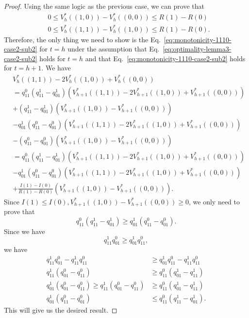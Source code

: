 \begin{proof}
Using the same logic as the previous case, we can prove that 
\begin{align*}
    &0\leq V_h^*\left((1,0)\right)-V_h^*((0,0))\leq{R(1)-R(0)}\\
    &0\leq V_h^*\left((1,1)\right)-V_h^*((1,0))\leq R(1)-R(0).
\end{align*}
Therefore, the only thing we need to show is the Eq.~\eqref{eq:monotonicity-1110-case2-sub2} for $t=h$ under the assumption that Eq.~\eqref{eq:optimality-lemma3-case2-sub2} holds for $t=h$ and that Eq.~\eqref{eq:monotonicity-1110-case2-sub2} holds for $t=h+1$. We have
\begin{align*}
    &V_h^*\left((1,1)\right)-2V_h^*((1,0))+V_h^*((0,0))\\&=q^0_{11}\left(q^1_{11}-q^1_{01}\right)\left(V_{h+1}^*\left((1,1)\right)-2V_{h+1}^*((1,0))+V_{h+1}^*((0,0))\right)\\
    &+\left(q^1_{11}-q^1_{01}\right)\left(V_{h+1}^*\left((1,0)\right)-V_{h+1}^*\left((0,0)\right)\right)\\
    &-q^1_{01}\left(q^0_{11}-q^0_{01}\right)\left(V_{h+1}^*\left((1,1)\right)-2V_{h+1}^*((1,0))+V_{h+1}^*((0,0))\right)\\
    &-\left(q^0_{11}-q^0_{01}\right)\left(V_{h+1}^*\left((1,0)\right)-V_{h+1}^*\left((0,0)\right)\right)\\
    &=q^0_{11}\left(q^1_{11}-q^1_{01}\right)\left(V_{h+1}^*\left((1,1)\right)-2V_{h+1}^*((1,0))+V_{h+1}^*((0,0))\right)\\
    &-q^1_{01}\left(q^0_{11}-q^0_{01}\right)\left(V_{h+1}^*\left((1,1)\right)-2V_{h+1}^*((1,0))+V_{h+1}^*((0,0))\right)\\
    &+\frac{I(1)-I(0)}{R(1)-R(0)}\left(V_{h+1}^*\left((1,0)\right)-V_{h+1}^*\left((0,0)\right)\right).
\end{align*}
Since $I(1)\leq I(0),V_{h+1}^*\left((1,0)\right)-V_{h+1}^*\left((0,0)\right)\geq 0$, we only need to prove that 
\begin{equation*}
    q^0_{11}\left(q^1_{11}-q^1_{01}\right)\geq q^1_{01}\left(q^0_{11}-q^0_{01}\right).
\end{equation*}
Since we have
\begin{equation*}
    q^1_{11}q^0_{01}\geq q^1_{01}q^0_{11},
\end{equation*}
we have
\begin{align*}
    q^1_{11}q^0_{01}-q^1_{11}q^0_{11}&\geq q^1_{01}q^0_{11}-q^1_{11}q^0_{11}\\
    q^1_{11}\left(q^0_{01}-q^0_{11}\right)&\geq q^0_{11}(q^1_{01}-q^1_{11})\\
    q^1_{01}\left(q^0_{01}-q^0_{11}\right)\geq q^1_{11}\left(q^0_{01}-q^0_{11}\right)&\geq q^0_{11}(q^1_{01}-q^1_{11})\\
    q^1_{01}\left(q^0_{11}-q^0_{01}\right)&\leq q^0_{11}(q^1_{11}-q^1_{01}).
\end{align*}
This will give us the desired result.

\end{proof}
